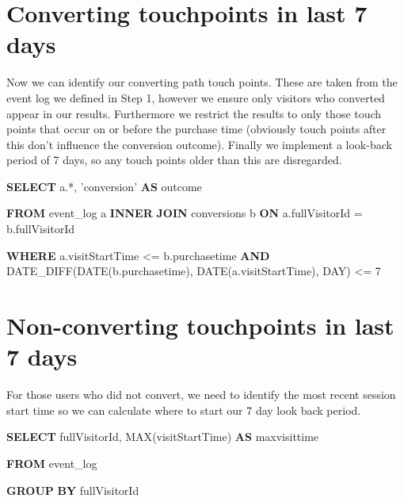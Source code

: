 \documentclass[]{book}
\newenvironment{Shaded}{\begin{snugshade}}{\end{snugshade}}
\newcommand{\DataTypeTok}[1]{\textcolor[rgb]{0.13,0.29,0.53}{#1}}
\newcommand{\DecValTok}[1]{\textcolor[rgb]{0.00,0.00,0.81}{#1}}
\newcommand{\FunctionTok}[1]{\textcolor[rgb]{0.00,0.00,0.00}{#1}}
\newcommand{\KeywordTok}[1]{\textcolor[rgb]{0.13,0.29,0.53}{\textbf{#1}}}
\newcommand{\NormalTok}[1]{#1}
\newcommand{\StringTok}[1]{\textcolor[rgb]{0.31,0.60,0.02}{#1}}
\begin{document}
\hypertarget{converting-touchpoints-in-last-7-days}{%
\section{Converting touchpoints in last 7 days}\label{converting-touchpoints-in-last-7-days}}

Now we can identify our converting path touch points. These are taken from the event log
we defined in Step 1, however we ensure only visitors who converted appear
in our results. Furthermore we restrict the results to only those touch points
that occur on or before the purchase time (obviously touch points after this don't influence
the conversion outcome). Finally we implement a look-back period of 7 days, so
any touch points older than this are disregarded.

\begin{Shaded}
\begin{Highlighting}[]
  \KeywordTok{SELECT}\NormalTok{ a.*,}
         \StringTok{'conversion'} \KeywordTok{AS}\NormalTok{ outcome}

  \KeywordTok{FROM}\NormalTok{ event_log a}
    \KeywordTok{INNER} \KeywordTok{JOIN}\NormalTok{ conversions b }\KeywordTok{ON}\NormalTok{ a.fullVisitorId = b.fullVisitorId  }

  \KeywordTok{WHERE}\NormalTok{ a.visitStartTime <= b.purchasetime }
    \KeywordTok{AND}\NormalTok{ DATE_DIFF(}\DataTypeTok{DATE}\NormalTok{(b.purchasetime), }\DataTypeTok{DATE}\NormalTok{(a.visitStartTime), }\DataTypeTok{DAY}\NormalTok{)  <= }\DecValTok{7}
\end{Highlighting}
\end{Shaded}

\hypertarget{non-converting-touchpoints-in-last-7-days}{%
\section{Non-converting touchpoints in last 7 days}\label{non-converting-touchpoints-in-last-7-days}}

For those users who did not convert, we need to identify the most recent
session start time so we can calculate where to start our 7 day look
back period.

\begin{Shaded}
\begin{Highlighting}[]

\KeywordTok{SELECT}\NormalTok{ fullVisitorId, }
  \FunctionTok{MAX}\NormalTok{(visitStartTime) }\KeywordTok{AS}\NormalTok{ maxvisittime}
  
  \KeywordTok{FROM}\NormalTok{ event_log}
  
  \KeywordTok{GROUP} \KeywordTok{BY}\NormalTok{ fullVisitorId}
\end{Highlighting}
\end{Shaded}
\end{document}
